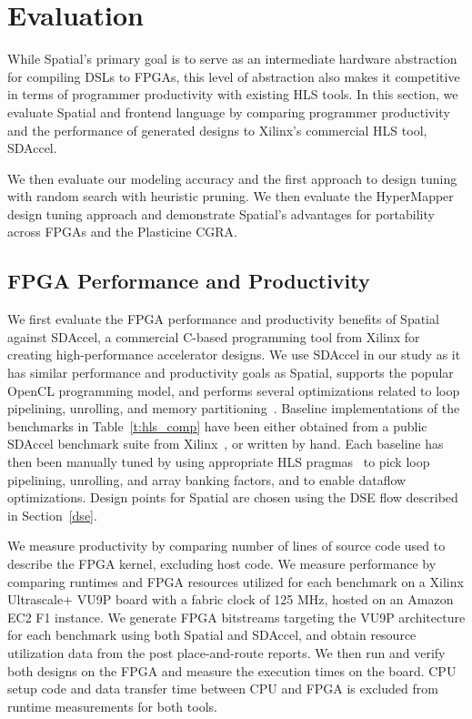 \section{Evaluation}
\label{spatial-evaluation}

While Spatial's primary goal is to serve as an intermediate hardware abstraction
for compiling DSLs to FPGAs, this level of abstraction also makes it competitive
in terms of programmer productivity with existing HLS tools.
In this section, we evaluate Spatial and frontend language
by comparing programmer productivity
and the performance of generated designs to Xilinx's commercial HLS tool, SDAccel.

We then evaluate our modeling accuracy and the first
approach to design tuning with random search with heuristic pruning.
We then evaluate the HyperMapper design tuning approach and demonstrate Spatial's advantages for portability across FPGAs and the Plasticine CGRA.

\subsection{FPGA Performance and Productivity}
We first evaluate the FPGA performance and productivity benefits of Spatial against SDAccel, a commercial C-based programming tool from Xilinx for creating high-performance accelerator designs. We use SDAccel in our study as it has similar performance and productivity goals as Spatial, supports the popular OpenCL programming model, and performs several optimizations related to loop pipelining, unrolling, and memory partitioning~\cite{sdaccel}. Baseline implementations of the benchmarks in Table~\ref{t:hls_comp} have been either obtained from a public SDAccel benchmark suite from Xilinx~\cite{sdaccelBench}, or written by hand. Each baseline has then been manually tuned by using appropriate HLS pragmas~\cite{hlsPragmaRef} to pick loop pipelining, unrolling, and array banking factors, and to enable dataflow optimizations. Design points for Spatial are chosen using the DSE flow described in Section~\ref{dse}.

We measure productivity by comparing number of lines of source code used to describe the FPGA kernel, excluding host code. We measure performance by comparing runtimes and FPGA resources utilized for each benchmark on a Xilinx Ultrascale+ VU9P board with a fabric clock of 125 MHz, hosted on an Amazon EC2 F1 instance. We generate FPGA bitstreams targeting the VU9P architecture for each benchmark using both Spatial and SDAccel, and obtain resource utilization data from the post place-and-route reports. We then run and verify both designs on the FPGA and measure the execution times on the board. CPU setup code and data transfer time between CPU and FPGA is excluded from runtime measurements for both tools.

